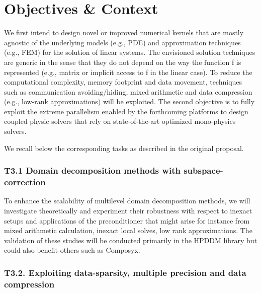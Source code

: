 
\section{Objectives \& Context}

We first intend to design novel or improved numerical kernels that are mostly agnostic of the
underlying models (e.g., PDE) and approximation techniques (e.g., FEM) for the solution of linear
systems. The envisioned solution techniques are generic in the sense that they do not depend on the
way the function f is represented (e.g., matrix or implicit access to f in the linear case). To reduce the
computational complexity, memory footprint and data movement, techniques such as communication
avoiding/hiding, mixed arithmetic and data compression (e.g., low-rank approximations) will be
exploited. The second objective is to fully exploit the extreme parallelism enabled by the forthcoming
platforms to design coupled physic solvers that rely on state-of-the-art optimized mono-physics
solvers.

We recall below the corresponding tasks as described in the original proposal. 



\subsubsection*{T3.1 Domain decomposition methods with subspace-correction}

 To enhance the scalability of
multilevel domain decomposition methods, we will investigate theoretically and experiment their
robustness with respect to inexact setups and applications of the preconditioner that might arise for
instance from mixed arithmetic calculation, inexact local solves, low rank approximations. The
validation of these studies will be conducted primarily in the HPDDM library but could also benefit
others such as Composyx.
\subsubsection*{T3.2. Exploiting data-sparsity, multiple precision and data compression}

